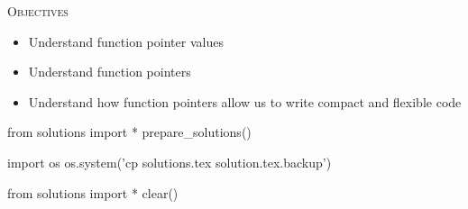 
\textsc{Objectives}
\begin{itemize}
\item Understand function pointer values
\item Understand function pointers
\item Understand how function pointers allow us to write compact and flexible code
\end{itemize}





\begin{python0}
from solutions import *
prepare_solutions()
\end{python0}
\begin{python}
import os
os.system('cp solutions.tex solution.tex.backup')  
\end{python}

\begin{python0}
from solutions import *
clear()
\end{python0}

